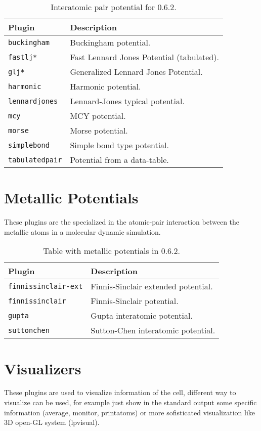 \begin{table}[h!]\centering
 \begin{tabular}{|l|p{10cm}|}\hline
 Plugin & Description \\
 \hline\hline
 \texttt{buckingham} & Buckingham potential.\\
 \hline
 \texttt{fastlj*} & Fast Lennard Jones Potential (tabulated). \\
 \hline
 \texttt{glj*} & Generalized Lennard Jones Potential. \\
 \hline
 \texttt{harmonic} & Harmonic potential.\\
 \hline
 \texttt{lennardjones} & Lennard-Jones typical potential.\\
 \hline
 \texttt{mcy} & MCY potential.\\
 \hline
 \texttt{morse} & Morse potential.\\
 \hline
 \texttt{simplebond} & Simple bond type potential.\\
 \hline
 \texttt{tabulatedpair} & Potential from a data-table.\\
 \hline
 \end{tabular}
\label{tab:modpotentials}
\caption{Interatomic pair potential for {\lpmd} 0.6.2.}
\end{table}

\section{Metallic Potentials}
These plugins are the specialized in the atomic-pair interaction between the
metallic atoms in a molecular dynamic simulation.

\begin{table}[h!]\centering
 \begin{tabular}{|l|p{13cm}|}\hline
 Plugin & Description \\
 \hline\hline
 \texttt{finnissinclair-ext} & Finnis-Sinclair extended potential.\\
 \hline
 \texttt{finnissinclair} & Finnis-Sinclair potential.\\
 \hline
 \texttt{gupta} & Gupta interatomic potential.\\
 \hline
 \texttt{suttonchen} & Sutton-Chen interatomic potential.\\
 \hline
 \end{tabular}
\label{tab:modmetalpotentials}
\caption{Table with metallic potentials in {\lpmd} 0.6.2.}
\end{table}


\section{Visualizers}
These plugins are used to visualize information of the cell, different way to
visualize can be used, for example just show in the standard output some
specific information (average, monitor, printatoms) or more sofisticated
visualization like 3D open-GL system (lpvisual).


